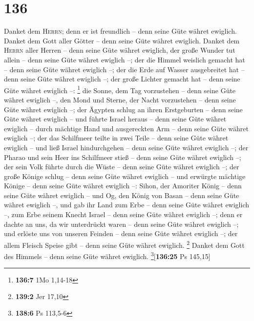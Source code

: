 \hypertarget{section-135}{%
\section{136}\label{section-135}}

 Danket dem \textsc{Herrn}; denn er ist freundlich -- denn
seine Güte währet ewiglich.  Danket dem Gott aller Götter
-- denn seine Güte währet ewiglich.  Danket dem
\textsc{Herrn} aller Herren -- denn seine Güte währet ewiglich,
 der große Wunder tut allein -- denn seine Güte währet
ewiglich --;  der die Himmel weislich gemacht hat -- denn
seine Güte währet ewiglich --;  der die Erde auf Wasser
ausgebreitet hat -- denn seine Güte währet ewiglich --; 
der große Lichter gemacht hat -- denn seine Güte währet ewiglich --:
\footnote{\textbf{136:7} 1Mo 1,14-18}  die Sonne, dem Tag
vorzustehen -- denn seine Güte währet ewiglich --,  den
Mond und Sterne, der Nacht vorzustehen -- denn seine Güte währet
ewiglich --;  der Ägypten schlug an ihren Erstgeburten --
denn seine Güte währet ewiglich --  und führte Israel
heraus -- denn seine Güte währet ewiglich --  durch
mächtige Hand und ausgereckten Arm -- denn seine Güte währet ewiglich
--;  der das Schilfmeer teilte in zwei Teile -- denn
seine Güte währet ewiglich --  und ließ Israel
hindurchgehen -- denn seine Güte währet ewiglich --;  der
Pharao und sein Heer ins Schilfmeer stieß -- denn seine Güte währet
ewiglich --;  der sein Volk führte durch die Wüste --
denn seine Güte währet ewiglich --;  der große Könige
schlug -- denn seine Güte währet ewiglich --  und
erwürgte mächtige Könige -- denn seine Güte währet ewiglich --:
 Sihon, der Amoriter König -- denn seine Güte währet
ewiglich --  und Og, den König von Basan -- denn seine
Güte währet ewiglich --,  und gab ihr Land zum Erbe --
denn seine Güte währet ewiglich --,  zum Erbe seinem
Knecht Israel -- denn seine Güte währet ewiglich --; 
denn er dachte an uns, da wir unterdrückt waren -- denn seine Güte
währet ewiglich --;  und erlöste uns von unseren Feinden
-- denn seine Güte währet ewiglich --;  der allem Fleisch
Speise gibt -- denn seine Güte währet ewiglich. \footnote{\textbf{139:2}
  Jer 17,10}  Danket dem Gott des Himmels -- denn seine
Güte währet ewiglich. \footnote{\textbf{138:6} Ps 113,5-6}{[}\textbf{136:25}
Ps 145,15{]}

